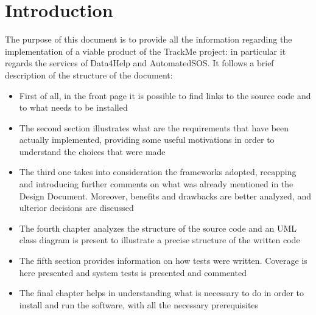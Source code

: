\section{Introduction}
The purpose of this document is to provide all the information regarding the implementation of a viable product of the TrackMe project: in
particular it regards the services of Data4Help and AutomatedSOS. 
It follows a brief description of the structure of the document:
\begin{itemize}
\item First of all, in the front page it is possible to find links to the source code and to what needs to be installed
\item The second section illustrates what are the requirements that have been actually implemented, providing some useful motivations
in order to understand the choices that were made 
\item The third one takes into consideration the frameworks adopted, recapping and introducing further comments on what was already
mentioned in the Design Document. Moreover, benefits and drawbacks are better analyzed, and ulterior decisions are discussed
\item The fourth chapter analyzes the structure of the source code and an UML class diagram is present to illustrate a precise structure of
the written code 
\item The fifth section provides information on how tests were written. Coverage is here presented and system tests is presented and commented
\item The final chapter helps in understanding what is necessary to do in order to install and run the software, with all the necessary prerequisites 
\end{itemize}
